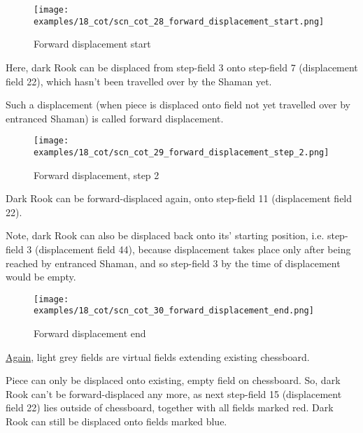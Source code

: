 \noindent
\begin{figure}[!h]
\texttt{[image: examples/18\_cot/scn\_cot\_28\_forward\_displacement\_start.png]}
\caption{Forward displacement start}
\label{fig:scn_cot_28_forward_displacement_start}
\end{figure}

Here, dark Rook can be displaced from step-field 3 onto step-field 7 (displacement field 22),
which hasn't been travelled over by the Shaman yet.

Such a displacement (when piece is displaced onto field not yet travelled over by entranced Shaman)
is called forward displacement.

\clearpage %

\noindent
\begin{figure}[!h]
\texttt{[image: examples/18\_cot/scn\_cot\_29\_forward\_displacement\_step\_2.png]}
\caption{Forward displacement, step 2}
\label{fig:scn_cot_29_forward_displacement_step_2}
\end{figure}

Dark Rook can be forward-displaced again, onto step-field 11 (displacement field 22).

Note, dark Rook can also be displaced back onto its' starting position, i.e. step-field 3
(displacement field 44), because displacement takes place only after being reached by
entranced Shaman, and so step-field 3 by the time of displacement would be empty.

\clearpage %

\noindent
\begin{figure}[!h]
\texttt{[image: examples/18\_cot/scn\_cot\_30\_forward\_displacement\_end.png]}
\caption{Forward displacement end}
\label{fig:scn_cot_30_forward_displacement_end}
\end{figure}

\hyperref[fig:scn_hd_04_centaur_off_board]{Again},
light grey fields are virtual fields extending existing chessboard.

Piece can only be displaced onto existing, empty field on chessboard. So, dark Rook can't be
forward-displaced any more, as next step-field 15 (displacement field 22) lies outside of
chessboard, together with all fields marked red. Dark Rook can still be displaced onto fields
marked blue.

